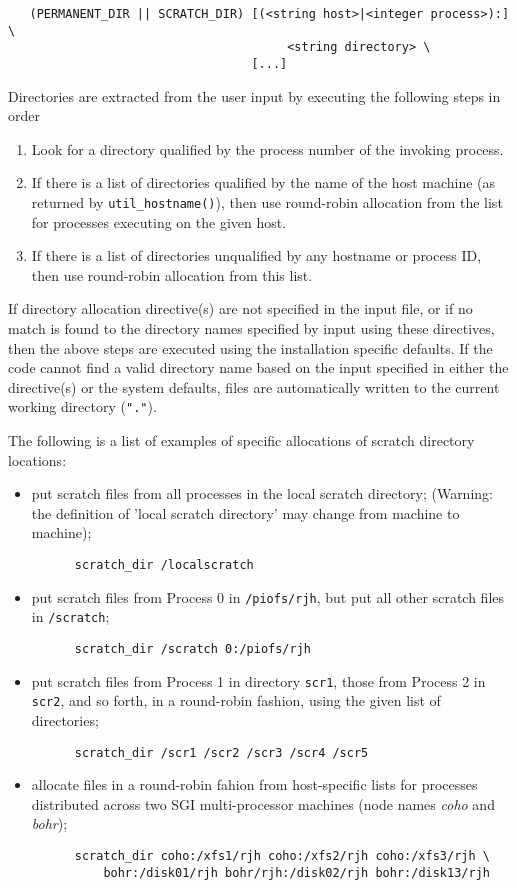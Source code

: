 \begin{verbatim}
   (PERMANENT_DIR || SCRATCH_DIR) [(<string host>|<integer process>):] \
                                       <string directory> \ 
                                  [...]
\end{verbatim}

Directories are extracted from the user input by executing the
following steps in order
\begin{enumerate}
\item Look for a directory qualified by the process number of the
  invoking process.
\item If there is a list of directories qualified by the name of the
  host machine (as returned by \verb+util_hostname()+), then use
  round-robin allocation from the list for processes executing on the
  given host. 
\item If there is a list of directories unqualified by any hostname
  or process ID, then use round-robin allocation from this list.
\end{enumerate}
If directory allocation directive(s) are not specified in the input
file, or if no match is found to the directory names specified by
input using these directives, then the above steps are executed using
the installation specific defaults.  If the code cannot find a valid
directory name based on the input specified in either the directive(s)
or the system defaults, files are automatically written to the current
working directory (\verb+"."+).

The following is a list of examples of specific allocations of scratch
directory locations:
\begin{itemize}
\item put scratch files from all processes in the local scratch directory; 
(Warning: the definition of 'local scratch directory' may change from 
machine to machine);
\begin{verbatim}
      scratch_dir /localscratch
\end{verbatim}
\item put scratch files from Process 0 in \verb+/piofs/rjh+, but put all 
other scratch files in \verb+/scratch+;
\begin{verbatim}
      scratch_dir /scratch 0:/piofs/rjh
\end{verbatim}
\item put scratch files from Process 1 in directory \verb+scr1+, those from
Process 2 in \verb+scr2+, and so forth, in a round-robin fashion, using the
given list of directories;
\begin{verbatim}
      scratch_dir /scr1 /scr2 /scr3 /scr4 /scr5
\end{verbatim}
\item allocate files in a round-robin fahion from
  host-specific lists for processes distributed across two
 SGI multi-processor machines (node names {\it coho} and {\it bohr});
\begin{verbatim}
      scratch_dir coho:/xfs1/rjh coho:/xfs2/rjh coho:/xfs3/rjh \
          bohr:/disk01/rjh bohr/rjh:/disk02/rjh bohr:/disk13/rjh
\end{verbatim}
\end{itemize}

